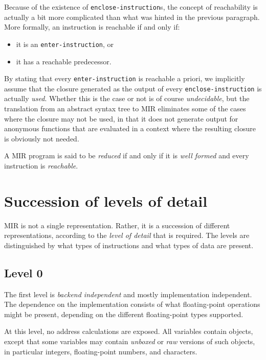 Because of the existence of \texttt{enclose-instruction}s, the concept
of reachability is actually a bit more complicated than what was
hinted in the previous paragraph.  More formally, an instruction is
reachable if and only if:

\begin{itemize}
\item it is an \texttt{enter-instruction}, or
\item it has a reachable predecessor.
\end{itemize}

By stating that every \texttt{enter-instruction} is reachable a
priori, we implicitly assume that the closure generated as the output
of every \texttt{enclose-instruction} is actually \emph{used}.
Whether this is the case or not is of course \emph{undecidable}, but
the translation from an abstract syntax tree to MIR eliminates some of
the cases where the closure may not be used, in that it does not
generate output for anonymous functions that are evaluated in a
context where the resulting closure is obviously not needed.

A MIR program is said to be \emph{reduced} if and only if it is
\emph{well formed} and every instruction is \emph{reachable}. 

\section{Succession of levels of detail}

MIR is not a single representation.  Rather, it is a succession of
different representations, according to the \emph{level of detail}
that is required.  The levels are distinguished by what types of
instructions and what types of data are present. 

\subsection{Level 0}

The first level is \emph{backend independent} and mostly
implementation independent.  The dependence on the implementation
consists of what floating-point operations might be present, depending
on the different floating-point types supported.

At this level, no address calculations are exposed.  All variables
contain \cl{} objects, except that some variables may contain
\emph{unboxed} or \emph{raw} versions of such objects, in particular
integers, floating-point numbers, and characters.

